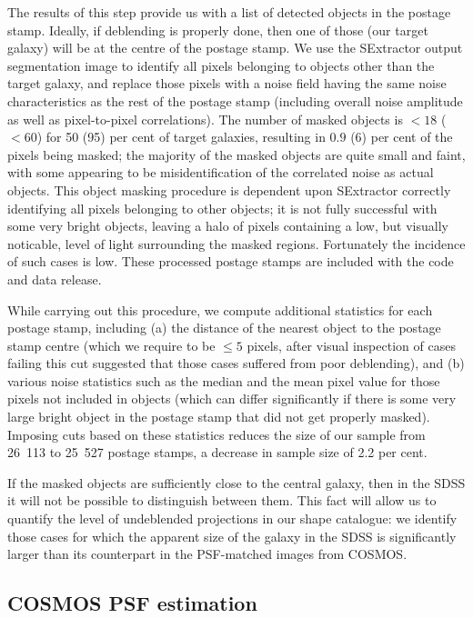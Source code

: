 \documentclass[twocolumn,useAMS,usenatbib]{mn2e}
\newcommand{\newtext}{}
\begin{document}
The results of this step provide us with a list of detected objects in
the postage stamp.  Ideally, if deblending is properly done, then one
of those (our target galaxy) will be at the
centre of the postage stamp.   We use the SExtractor output
segmentation image to identify all pixels belonging to 
objects other than the target galaxy, and replace those pixels with a noise field having the same
noise characteristics as the rest of the postage stamp (including
overall noise amplitude as well as pixel-to-pixel correlations).
\newtext{The number of masked objects is $<18$ ($<60$) for 50 (95) per
cent of target galaxies, resulting in $0.9$ ($6$) per cent of the
pixels being masked; the majority of the masked objects are quite
small and faint, with some appearing to be misidentification of the
correlated noise as actual objects.}  
This object masking procedure is dependent upon SExtractor correctly
identifying all pixels belonging to other objects; it is not fully
successful with some very bright objects, leaving a halo of pixels
containing a low, but visually noticable, level of light surrounding
the masked regions.  Fortunately the incidence of such cases is low. 
These processed postage stamps are included with the code and data release.

While carrying out this procedure, we compute additional statistics
for each postage stamp, including (a) the distance of the nearest
object to the postage stamp centre (which we require to be $\leq 5$
pixels, after visual inspection of cases failing this cut suggested
that those cases suffered from poor deblending), and (b) various noise
statistics such as the median and the mean pixel value for those
pixels not included in objects (which can differ significantly if
there is some very large bright object in the postage stamp that did
not get properly masked).  Imposing cuts based on these statistics
reduces the size of our sample from 26~113 to 25~527 postage stamps, a
decrease in sample size of 2.2 per cent.

If the masked objects are sufficiently close to the central
galaxy, then in the SDSS it will not be possible to distinguish
between them.  This fact will allow us to quantify the level of
undeblended projections in our shape catalogue: we identify those cases
for which the apparent size of the galaxy in the SDSS is significantly
larger than its counterpart in the PSF-matched images from COSMOS.

\subsection{COSMOS PSF estimation}\label{SS:cospsf}
\end{document}
